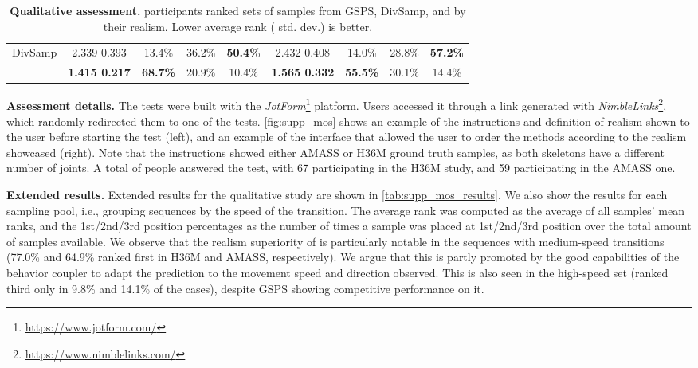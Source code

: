 \documentclass[10pt,twocolumn,letterpaper]{article}
\begin{document}
\begin{table*}[t!]
\begin{tabular}{l@{\hskip 8mm}cccc@{\hskip 8mm}cccc}
        DivSamp & 2.339  0.393 & 13.4\% & 36.2\% & \textbf{50.4\%} & 2.432  0.408 & 14.0\% & 28.8\% & \textbf{57.2\%}  \\
        \modelname{} & \textbf{1.415  0.217} & \textbf{68.7\%} & 20.9\% & 10.4\% & \textbf{1.565  0.332} & \textbf{55.5\%} & 30.1\% & 14.4\% \\
        \bottomrule
    \end{tabular}
    \caption{\textbf{Qualitative assessment.} \participants{} participants ranked sets of samples from GSPS, DivSamp, and \modelname{} by their realism. Lower average rank ( std. dev.) is better.}
    \label{tab:supp_mos_results}\vspace{-0.3cm}
\end{table*}
\setlength{\tabcolsep}{6pt}


\textbf{Assessment details. } The tests were built with the \textit{JotForm}\footnote{\url{https://www.jotform.com/}} platform. Users accessed it through a link generated with \textit{NimbleLinks}\footnote{\url{https://www.nimblelinks.com/}}, which randomly redirected them to one of the tests. \autoref{fig:supp_mos} shows an example of the instructions and definition of realism shown to the user before starting the test (left), and an example of the interface that allowed the user to order the methods according to the realism showcased (right). Note that the instructions showed either AMASS or H36M ground truth samples, as both skeletons have a different number of joints. A total of \participants{} people answered the test, with 67 participating in the H36M study, and 59 participating in the AMASS one.


\textbf{Extended results.} Extended results for the qualitative study are shown in \autoref{tab:supp_mos_results}. We also show the results for each sampling pool, i.e., grouping sequences by the speed of the transition. The average rank was computed as the average of all samples' mean ranks, and the 1st/2nd/3rd position percentages as the number of times a sample was placed at 1st/2nd/3rd position over the total amount of samples available. We observe that the realism superiority of \modelname{} is particularly notable in the sequences with medium-speed transitions (77.0\% and 64.9\% ranked first in H36M and AMASS, respectively). We argue that this is partly promoted by the good capabilities of the behavior coupler to adapt the prediction to the movement speed and direction observed. This is also seen in the high-speed set (ranked third only in 9.8\% and 14.1\% of the cases), despite GSPS showing competitive performance on it.
 
\end{document}
